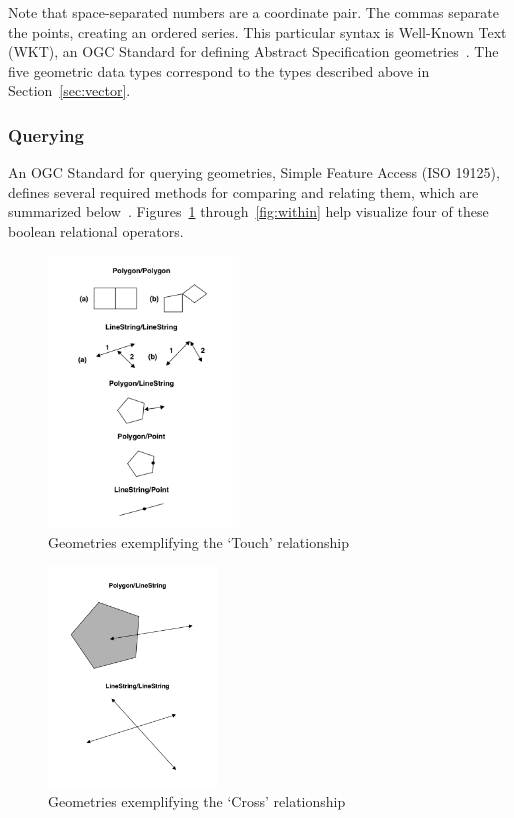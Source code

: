 Note that space-separated numbers are a coordinate pair. The commas separate the points, creating an ordered series. This particular syntax is Well-Known Text (WKT), an OGC Standard for defining Abstract Specification geometries~\cite{ogc}. The five geometric data types correspond to the types described above in Section~\ref{sec:vector}.

\subsubsection{Querying}
An OGC Standard for querying geometries, Simple Feature Access (ISO 19125), defines several required methods for comparing and relating them, which are summarized below~\cite{}. Figures~\ref{fig:touches} through~\ref{fig:within} help visualize four of these boolean relational operators.

\begin{figure}
    \centering

    \includegraphics[width=0.45\textwidth]{figures/touches.png}
    
    \caption{Geometries exemplifying the `Touch' relationship}
    \label{fig:touches}
    
\end{figure}

\begin{figure}
    \centering

    \includegraphics[width=0.4\textwidth]{figures/crosses.png}
    
    \caption{Geometries exemplifying the `Cross' relationship}
    \label{fig:crosses}
    
\end{figure}

